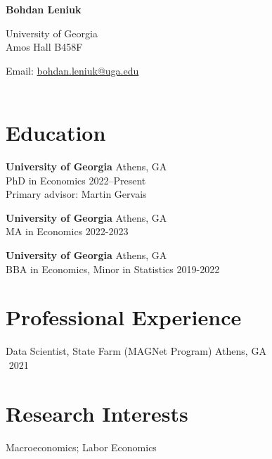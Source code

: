 \documentclass[11pt,a4paper]{article}
\begin{document}
	
	\begin{center}
		{\LARGE \textbf{Bohdan Leniuk}} \\[6pt]
	\end{center}
	\begin{minipage}{0.45\linewidth}
		\begin{flushleft}
			University of Georgia \\
			Amos Hall B458F \\
		\end{flushleft}
	\end{minipage}
	\hfill
	\begin{minipage}{0.45\linewidth}
		\begin{flushright}
			Email: \href{mailto:bohdan.leniuk@uga.edu}{bohdan.leniuk@uga.edu} \\
			$\text{ }$
		\end{flushright}
	\end{minipage}
	
	\section{Education}
	\textbf{University of Georgia} \hfill Athens, GA \\
	PhD in Economics \hfill 2022--Present \\
	Primary advisor: Martin Gervais
	
	\textbf{University of Georgia} \hfill Athens, GA \\
	MA in Economics \hfill 2022-2023
	
	\textbf{University of Georgia} \hfill Athens, GA \\
	BBA in Economics, Minor in Statistics \hfill 2019-2022
	
	\section{Professional Experience}
	
	Data Scientist, State Farm (MAGNet Program)  \hfill Athens, GA \\
	$\text{}$ \hfill 2021
	
	\section{Research Interests}
	Macroeconomics; Labor Economics
	
\end{document}

